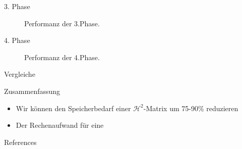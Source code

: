 \documentclass[10pt]{beamer}
\begin{document}
\begin{frame}{3. Phase}
  \begin{figure}
    \centering
    \caption{Performanz der 3.Phase.}
  \end{figure}
\end{frame}

\begin{frame}{4. Phase}
  \begin{figure}
    \centering
    \caption{Performanz der 4.Phase.}
  \end{figure}
\end{frame}

\begin{frame}{Vergleiche}

\end{frame}

\begin{frame}{Zusammenfassung}
  \begin{itemize}
    \item Wir können den Speicherbedarf einer \(\mathcal{H}^2\)-Matrix um
          75-90\% reduzieren
    \item Der Rechenaufwand für eine
  \end{itemize}
\end{frame}

\begin{frame}[allowframebreaks]{References}

  
  

\end{frame}
\end{document}
